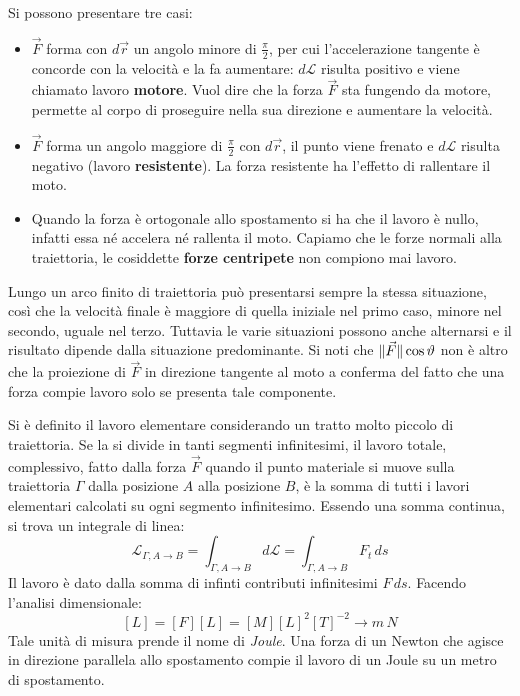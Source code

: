 \documentclass[10pt,a4paper]{book}
\DeclarePairedDelimiter{\norma}{\lVert}{\rVert} %
\begin{document}
Si possono presentare tre casi:
\begin{itemize}
	\item $\vec{F}$ forma con $d\vec{r}$ un angolo minore di $\frac{\pi}{2}$, per cui l'accelerazione tangente è concorde con la velocità e la fa aumentare: $d\mathcal{L}$ risulta positivo e viene chiamato lavoro \textbf{motore}. Vuol dire che la forza $\vec{F}$ sta fungendo da motore, permette al corpo di proseguire nella sua direzione e aumentare la velocità.
	\item $\vec{F}$ forma un angolo maggiore di $\frac{\pi}{2}$ con $d\vec{r}$, il punto viene frenato e $d\mathcal{L}$ risulta negativo (lavoro \textbf{resistente}). La forza resistente ha l'effetto di rallentare il moto.
	\item Quando la forza è ortogonale allo spostamento si ha che il lavoro è nullo, infatti essa né accelera né rallenta il moto. Capiamo che le forze normali alla traiettoria, le cosiddette \textbf{forze centripete} non compiono mai lavoro.
\end{itemize}
Lungo un arco finito di traiettoria può presentarsi sempre la stessa situazione, così che la velocità finale è maggiore di quella iniziale nel primo caso, minore nel secondo, uguale nel terzo. Tuttavia le varie situazioni possono anche alternarsi e il risultato dipende dalla situazione predominante.
Si noti che $\norma{\vec{F}} \cos\vartheta$ non è altro che la proiezione di $\vec{F}$ in direzione tangente al moto a conferma del fatto che una forza compie lavoro solo se presenta tale componente.

Si è definito il lavoro elementare considerando un tratto molto piccolo di traiettoria. Se la si divide in tanti segmenti infinitesimi, il lavoro totale, complessivo, fatto dalla forza $\vec{F}$ quando il punto materiale si muove sulla traiettoria $\Gamma$ dalla posizione $A$ alla posizione $B$, è la somma di tutti i lavori elementari calcolati su ogni segmento infinitesimo. Essendo una somma continua, si trova un integrale di linea:
\[
	\boxed{\mathcal{L}_{\Gamma, A\to B}=\int_{\Gamma, A\to B} d\mathcal{L}=\int_{\Gamma, A\to B} F_t\,ds}
\]
Il lavoro è dato dalla somma di infinti contributi infinitesimi $F\,ds$.
Facendo l'analisi dimensionale:
\[
	[L]=[F][L]=[M][L]^2[T]^{-2} \to m\,N
\]
Tale unità di misura prende il nome di \emph{Joule}. Una forza di un Newton che agisce in direzione parallela allo spostamento compie il lavoro di un Joule su un metro di spostamento.
\end{document}
